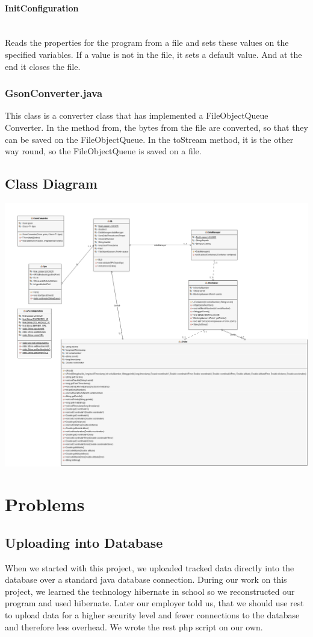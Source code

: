 \paragraph{InitConfiguration}\mbox{}\\
Reads the properties for the program from a file and sets these values on the specified variables. If a value is not in the file, it sets a default value. And at the end it closes the file.
\subsubsection{GsonConverter.java}
This class is a converter class that has implemented a FileObjectQueue Converter. In the method from, the bytes from the file are converted, so that they can be saved on the FileObjectQueue. In the toStream method, it is the other way round, so the FileObjectQueue is saved on a file.
\subsection{Class Diagram}
\begin{center}
\includegraphics[width=1\textwidth]{bilder/GPS_REST_UML_Diagram}
\end{center}
\clearpageauthor
\section{Problems}
\subsection{Uploading into Database}
When we started with this project, we uploaded tracked data directly into the database over a standard java database connection. During our work on this project, we learned the technology hibernate in school so we reconstructed our program and used hibernate. Later our employer told us, that we should use \gls{rest} to upload data for a higher security level and fewer connections to the database and therefore less overhead. We wrote the \gls{rest} \gls{php} script on our own. 
